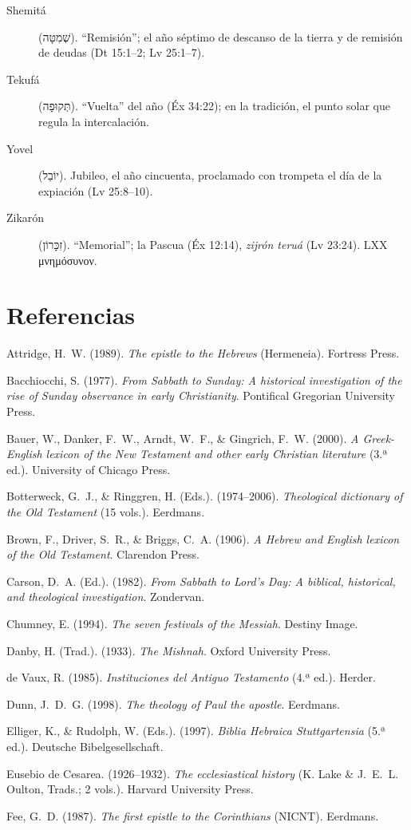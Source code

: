 \documentclass[11pt,letterpaper]{article}
\newcommand{\heb}[1]{\mbox{\foreignlanguage{hebrew}{#1}}}
\newcommand{\grc}[1]{\foreignlanguage{ancientgreek}{#1}}
\newcommand{\refapa}[1]{\par{\RaggedRight\hangindent=1.27cm\hangafter=1\noindent #1\par}\vspace{4pt}}
\begin{document}
\begin{description}
\item[Shemitá] (\heb{שְׁמִטָּה}). ``Remisión''; el año séptimo de descanso de la tierra y de remisión de deudas (Dt 15:1--2; Lv 25:1--7).
\item[Tekufá] (\heb{תְּקוּפָה}). ``Vuelta'' del año (Éx 34:22); en la tradición, el punto solar que regula la intercalación.
\item[Yovel] (\heb{יוֹבֵל}). Jubileo, el año cincuenta, proclamado con trompeta el día de la expiación (Lv 25:8--10).
\item[Zikarón] (\heb{זִכָּרוֹן}). ``Memorial''; la Pascua (Éx 12:14), \emph{zijrón teruá} (Lv 23:24). LXX \grc{μνημόσυνον}.
\end{description}

\section*{Referencias}
\refapa{Attridge, H.~W. (1989). \emph{The epistle to the Hebrews} (Hermeneia). Fortress Press.}
\refapa{Bacchiocchi, S. (1977). \emph{From Sabbath to Sunday: A historical investigation of the rise of Sunday observance in early Christianity}. Pontifical Gregorian University Press.}
\refapa{Bauer, W., Danker, F.~W., Arndt, W.~F., \& Gingrich, F.~W. (2000). \emph{A Greek-English lexicon of the New Testament and other early Christian literature} (3.ª ed.). University of Chicago Press.}
\refapa{Botterweck, G.~J., \& Ringgren, H. (Eds.). (1974--2006). \emph{Theological dictionary of the Old Testament} (15 vols.). Eerdmans.}
\refapa{Brown, F., Driver, S.~R., \& Briggs, C.~A. (1906). \emph{A Hebrew and English lexicon of the Old Testament}. Clarendon Press.}
\refapa{Carson, D.~A. (Ed.). (1982). \emph{From Sabbath to Lord's Day: A biblical, historical, and theological investigation}. Zondervan.}
\refapa{Chumney, E. (1994). \emph{The seven festivals of the Messiah}. Destiny Image.}
\refapa{Danby, H. (Trad.). (1933). \emph{The Mishnah}. Oxford University Press.}
\refapa{de Vaux, R. (1985). \emph{Instituciones del Antiguo Testamento} (4.ª ed.). Herder.}
\refapa{Dunn, J.~D.~G. (1998). \emph{The theology of Paul the apostle}. Eerdmans.}
\refapa{Elliger, K., \& Rudolph, W. (Eds.). (1997). \emph{Biblia Hebraica Stuttgartensia} (5.ª ed.). Deutsche Bibelgesellschaft.}
\refapa{Eusebio de Cesarea. (1926--1932). \emph{The ecclesiastical history} (K. Lake \& J.~E.~L. Oulton, Trads.; 2 vols.). Harvard University Press.}
\refapa{Fee, G.~D. (1987). \emph{The first epistle to the Corinthians} (NICNT). Eerdmans.}
\end{document}
